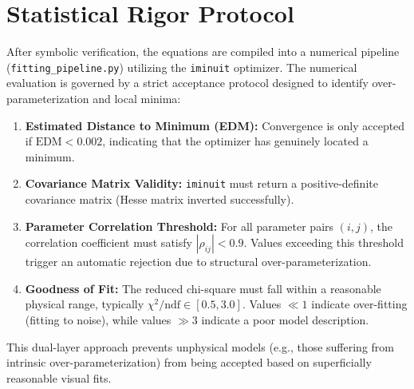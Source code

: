 \section{Statistical Rigor Protocol}
After symbolic verification, the equations are compiled into a numerical pipeline (\texttt{fitting\_pipeline.py}) utilizing the \texttt{iminuit} optimizer. The numerical evaluation is governed by a strict acceptance protocol designed to identify over-parameterization and local minima:
\begin{enumerate}
    \item \textbf{Estimated Distance to Minimum (EDM):} Convergence is only accepted if $\text{EDM} < 0.002$, indicating that the optimizer has genuinely located a minimum.
    \item \textbf{Covariance Matrix Validity:} \texttt{iminuit} must return a positive-definite covariance matrix (Hesse matrix inverted successfully).
    \item \textbf{Parameter Correlation Threshold:} For all parameter pairs $(i, j)$, the correlation coefficient must satisfy $|\rho_{ij}| < 0.9$. Values exceeding this threshold trigger an automatic rejection due to structural over-parameterization.
    \item \textbf{Goodness of Fit:} The reduced chi-square must fall within a reasonable physical range, typically $\chi^2/\text{ndf} \in [0.5, 3.0]$. Values $\ll 1$ indicate over-fitting (fitting to noise), while values $\gg 3$ indicate a poor model description.
\end{enumerate}
This dual-layer approach prevents unphysical models (e.g., those suffering from intrinsic over-parameterization) from being accepted based on superficially reasonable visual fits.
